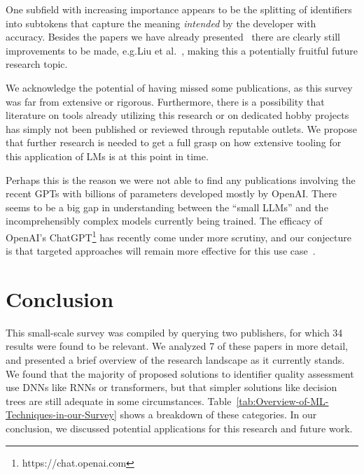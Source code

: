 \documentclass[conference]{IEEEtran}
\begin{document}
One subfield with increasing importance appears to be the splitting of identifiers into
subtokens that capture the meaning \emph{intended} by the developer with accuracy. Besides
the papers we have already presented~\cite{Gao2019IdentGen, Shi2022Splitting,
Allamanis2015Suggesting} there are clearly still improvements to be made, e.g.\@ Liu et
al.\@~\cite{Liu2021CHIS}, making this a potentially fruitful future research topic.

We acknowledge the potential of having missed some publications, as this survey was far
from extensive or rigorous. Furthermore, there is a possibility that literature on tools
already utilizing this research or on dedicated hobby projects has simply not been
published or reviewed through reputable outlets. We propose that further research is
needed to get a full grasp on how extensive tooling for this application of \acp{LM} is at
this point in time.

Perhaps this is the reason we were not able to find any publications involving the recent
\acp{GPT} with billions of parameters developed mostly by OpenAI. There seems to be a big
gap in understanding between the \enquote{small \acp{LLM}} and the incomprehensibly
complex models currently being trained. The efficacy of OpenAI's
ChatGPT\footnote{https://chat.openai.com} has recently come under more scrutiny, and our
conjecture is that targeted approaches will remain more effective for this use
case~\cite{Wu2023ChatGPT}.


\section{Conclusion}
\label{sec:Conclusion}

This small-scale survey was compiled by querying two publishers, for which 34 results were
found to be relevant. We analyzed 7 of these papers in more detail, and presented a brief
overview of the research landscape as it currently stands. We found that the majority of
proposed solutions to identifier quality assessment use \acp{DNN} like \acp{RNN} or
transformers, but that simpler solutions like decision trees are still adequate in some
circumstances. Table~\ref{tab:Overview-of-ML-Techniques-in-our-Survey} shows a breakdown
of these categories. In our conclusion, we discussed potential applications for this
research and future work.
\end{document}
